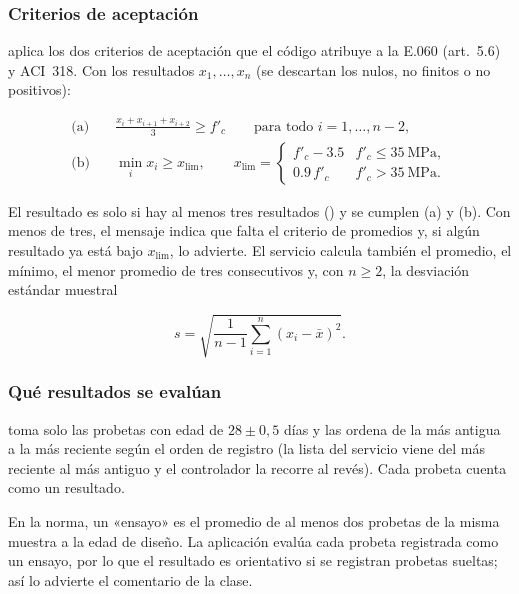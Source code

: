 \subsubsection{Criterios de aceptación}

 aplica los dos criterios de aceptación que el
código atribuye a la E.060 (art.~5.6) y ACI~318. Con los resultados $x_1, \dots, x_n$ (se descartan los nulos, no
finitos o no positivos):

\begin{align}
	\text{(a)} \quad & \frac{x_i + x_{i+1} + x_{i+2}}{3} \ge f'_c \qquad \text{para todo } i = 1, \dots, n-2, \\
	\text{(b)} \quad & \min_i x_i \ge x_{\lim}, \qquad
	x_{\lim} =
	\begin{cases}
		f'_c - 3.5 & f'_c \le 35\ \text{MPa},\\
		0.9\, f'_c & f'_c > 35\ \text{MPa}.
	\end{cases}
\end{align}

El resultado es  solo si hay al menos tres resultados () y se cumplen (a) y (b). Con
menos de tres, el mensaje indica que falta el criterio de promedios y, si algún resultado ya está bajo $x_{\lim}$, lo
advierte. El servicio calcula también el promedio, el mínimo, el menor promedio de tres consecutivos y, con $n \ge 2$, la
desviación estándar muestral

\begin{equation}
	s = \sqrt{\frac{1}{n-1} \sum_{i=1}^{n} \left(x_i - \bar{x}\right)^2 } .
\end{equation}

\subsubsection{Qué resultados se evalúan}

 toma solo las probetas con edad de $28 \pm 0{,}5$ días y las ordena de la
más antigua a la más reciente según el orden de registro (la lista del servicio viene del más reciente al más antiguo y
el controlador la recorre al revés). Cada probeta cuenta como un resultado.

\begin{importante}
	En la norma, un «ensayo» es el promedio de al menos dos probetas de la misma muestra a la edad de diseño. La
	aplicación evalúa cada probeta registrada como un ensayo, por lo que el resultado es orientativo si se registran
	probetas sueltas; así lo advierte el comentario de la clase.
\end{importante}

